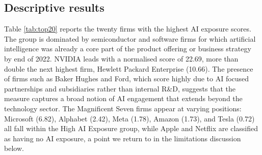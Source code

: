 \subsection{Descriptive results}

Table \ref{tab:top20} reports the twenty firms with the highest AI exposure scores. The group is dominated by semiconductor and software firms for which artificial intelligence was already a core part of the product offering or business strategy by end of 2022. NVIDIA leads with a normalised score of 22.69, more than double the next highest firm, Hewlett Packard Enterprise (10.66). The presence of firms such as Baker Hughes and Ford, which score highly due to AI focused partnerships and subsidiaries rather than internal R\&D, suggests that the measure captures a broad notion of AI engagement that extends beyond the technology sector. The Magnificent Seven firms appear at varying positions: Microsoft (6.82), Alphabet (2.42), Meta (1.78), Amazon (1.73), and Tesla (0.72) all fall within the High AI Exposure group, while Apple and Netflix are classified as having no AI exposure, a point we return to in the limitations discussion below.

